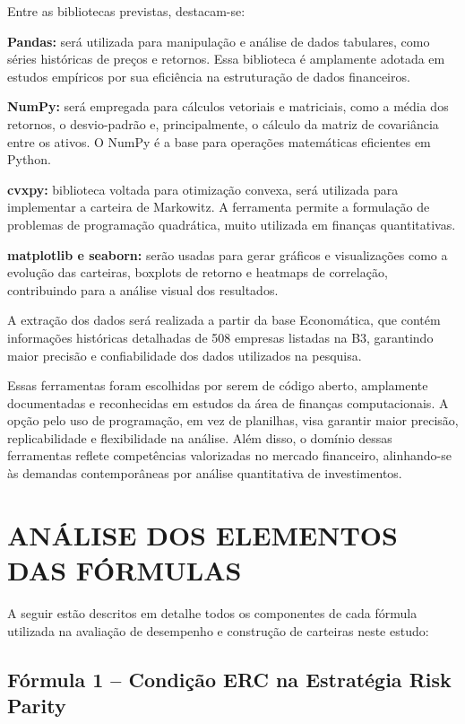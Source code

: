 Entre as bibliotecas previstas, destacam-se:

\textbf{Pandas:} será utilizada para manipulação e análise de dados tabulares, como séries históricas de preços e retornos. Essa biblioteca é amplamente adotada em estudos empíricos por sua eficiência na estruturação de dados financeiros.

\textbf{NumPy:} será empregada para cálculos vetoriais e matriciais, como a média dos retornos, o desvio-padrão e, principalmente, o cálculo da matriz de covariância entre os ativos. O NumPy é a base para operações matemáticas eficientes em Python.

\textbf{cvxpy:} biblioteca voltada para otimização convexa, será utilizada para implementar a carteira de Markowitz. A ferramenta permite a formulação de problemas de programação quadrática, muito utilizada em finanças quantitativas.

\textbf{matplotlib e seaborn:} serão usadas para gerar gráficos e visualizações como a evolução das carteiras, boxplots de retorno e heatmaps de correlação, contribuindo para a análise visual dos resultados.

A extração dos dados será realizada a partir da base Economática, que contém informações históricas detalhadas de 508 empresas listadas na B3, garantindo maior precisão e confiabilidade dos dados utilizados na pesquisa.

Essas ferramentas foram escolhidas por serem de código aberto, amplamente documentadas e reconhecidas em estudos da área de finanças computacionais. A opção pelo uso de programação, em vez de planilhas, visa garantir maior precisão, replicabilidade e flexibilidade na análise. Além disso, o domínio dessas ferramentas reflete competências valorizadas no mercado financeiro, alinhando-se às demandas contemporâneas por análise quantitativa de investimentos.

\section{ANÁLISE DOS ELEMENTOS DAS FÓRMULAS}

A seguir estão descritos em detalhe todos os componentes de cada fórmula utilizada na avaliação de desempenho e construção de carteiras neste estudo:

\subsection{Fórmula 1 -- Condição ERC na Estratégia Risk Parity}

